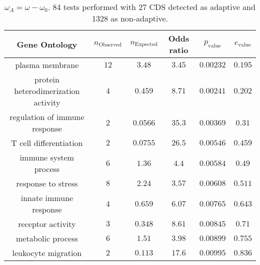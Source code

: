 \documentclass[USLetter,5pt]{article}
\begin{document}
\begin{table}[ht]
\centering
\begin{adjustbox}{width = 1\textwidth}
\small\begin{tabular}{|c|c|c|c|c|c|}
\hline
Gene Ontology & $n_{\mathrm{Observed}}$ & $n_{\mathrm{Expected}}$ & Odds ratio & $p_{\mathrm{value}}$ & $e_{\mathrm{value}}$\\
\hline
plasma membrane & $12$ & $3.48$ & $3.45$ & $0.00232$ & $0.195$\\
protein heterodimerization activity & $4$ & $0.459$ & $8.71$ & $0.00241$ & $0.202$\\
regulation of immune response & $2$ & $0.0566$ & $35.3$ & $0.00369$ & $0.31$\\
T cell differentiation & $2$ & $0.0755$ & $26.5$ & $0.00546$ & $0.459$\\
immune system process & $6$ & $1.36$ & $4.4$ & $0.00584$ & $0.49$\\
response to stress & $8$ & $2.24$ & $3.57$ & $0.00608$ & $0.511$\\
innate immune response & $4$ & $0.659$ & $6.07$ & $0.00765$ & $0.643$\\
receptor activity & $3$ & $0.348$ & $8.61$ & $0.00845$ & $0.71$\\
metabolic process & $6$ & $1.51$ & $3.98$ & $0.00899$ & $0.755$\\
leukocyte migration & $2$ & $0.113$ & $17.6$ & $0.00995$ & $0.836$\\
\hline
\end{tabular}
\end{adjustbox}
\caption{\textbf{$\omega_A =  \omega - \omega_0 $}. 84 tests performed with 27 CDS detected as adaptive and 1328 as non-adaptive.
}
\end{table}
\end{document}
